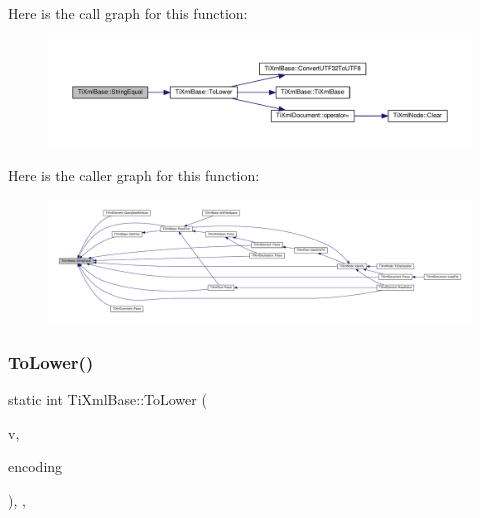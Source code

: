 Here is the call graph for this function\+:
\nopagebreak
\begin{figure}[H]
\begin{center}
\leavevmode
\includegraphics[width=350pt]{class_ti_xml_base_a51631e6986179558b9e5850723ed165a_cgraph}
\end{center}
\end{figure}
Here is the caller graph for this function\+:
\nopagebreak
\begin{figure}[H]
\begin{center}
\leavevmode
\includegraphics[width=350pt]{class_ti_xml_base_a51631e6986179558b9e5850723ed165a_icgraph}
\end{center}
\end{figure}
\mbox{\label{class_ti_xml_base_a799f17405a86a5c2029618e85f11a097}} 
\subsubsection{\texorpdfstring{To\+Lower()}{ToLower()}}
{\footnotesize\ttfamily static int Ti\+Xml\+Base\+::\+To\+Lower (\begin{DoxyParamCaption}\item[{int}]{v,  }\item[{\hyperlink{tinyxml_8h_a88d51847a13ee0f4b4d320d03d2c4d96}{Ti\+Xml\+Encoding}}]{encoding }\end{DoxyParamCaption})\hspace{0.3cm}{\ttfamily [inline]}, {\ttfamily [static]}, {\ttfamily [protected]}}

